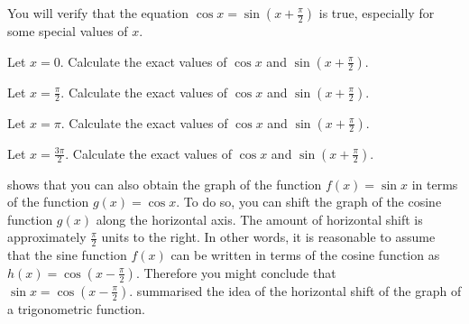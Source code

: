 \documentclass[a4paper,oneside,12pt]{article}
\begin{document}
\begin{exercise}
You will verify that the equation $\cos x = \sin(x + \frac{\pi}{2})$
is true, especially for some special values of $x$.
\begin{packedenum}
\item\label{subex:trigonometric:sin_left_shift_0}
  Let $x = 0$.  Calculate the exact values of $\cos x$ and
  $\sin(x + \frac{\pi}{2})$.

\item\label{subex:trigonometric:sin_left_shift_pi_half}
  Let $x = \frac{\pi}{2}$.  Calculate the exact values of $\cos x$ and
  $\sin(x + \frac{\pi}{2})$.

\item\label{subex:trigonometric:sin_left_shift_pi}
  Let $x = \pi$.  Calculate the exact values of $\cos x$ and
  $\sin(x + \frac{\pi}{2})$.

\item\label{subex:trigonometric:sin_left_shift_3pi_half}
  Let $x = \frac{3\pi}{2}$.  Calculate the exact values of $\cos x$
  and $\sin(x + \frac{\pi}{2})$.
\end{packedenum}
\end{exercise}


 shows that you can
also obtain the graph of the function $f(x) = \sin x$ in terms of the
function $g(x) = \cos x$.  To do so, you can shift the graph of the
cosine function $g(x)$ along the horizontal axis.  The amount of
horizontal shift is approximately $\frac{\pi}{2}$ units to the right.
In other words, it is reasonable to assume that the sine function
$f(x)$ can be written in terms of the cosine function as
$h(x) = \cos(x - \frac{\pi}{2})$.  Therefore you might conclude that
$\sin x = \cos(x - \frac{\pi}{2})$.
 summarised the idea of
the horizontal shift of the graph of a trigonometric function.
\end{document}
